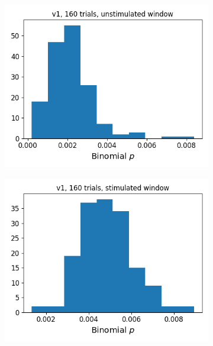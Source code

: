     \begin{figure}[p]
      \begin{subfigure}[h]{0.5\linewidth}
        \includegraphics[width=\linewidth]{figures/conway_maxwell/v1_1ms_binom_p_unstim.png}
        \label{fig:v1_1ms_binom_p_unstim}
      \end{subfigure}
      \begin{subfigure}[h]{0.5\linewidth}
        \includegraphics[width=\linewidth]{figures/conway_maxwell/v1_1ms_binom_p_stim.png}
        \label{fig:v1_1ms_binom_p_stim}

\end{subfigure}
\end{figure}
